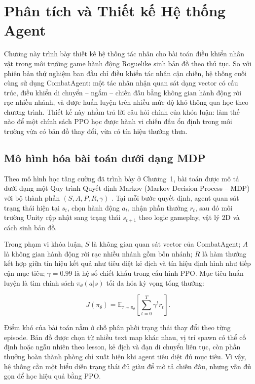 \setcounter{secnumdepth}{3}

\setcounter{chapter}{1}
\chapter[{PHÂN TÍCH VÀ THIẾT KẾ HỆ THỐNG AGENT}]{Phân tích và Thiết kế Hệ thống Agent}

Chương này trình bày thiết kế hệ thống tác nhân cho bài toán điều khiển nhân vật trong môi trường game hành động Roguelike sinh bản đồ theo thủ tục. So với phiên bản thử nghiệm ban đầu chỉ điều khiển tác nhân cận chiến, hệ thống cuối cùng sử dụng CombatAgent: một tác nhân nhận quan sát dạng vector có cấu trúc, điều khiển di chuyển -- ngắm -- chiến đấu bằng không gian hành động rời rạc nhiều nhánh, và được huấn luyện trên nhiều mức độ khó thông qua học theo chương trình. Thiết kế này nhằm trả lời câu hỏi chính của khóa luận: làm thế nào để một chính sách PPO học được hành vi chiến đấu ổn định trong môi trường vừa có bản đồ thay đổi, vừa có tín hiệu thưởng thưa.

\section{Mô hình hóa bài toán dưới dạng MDP}

Theo mô hình học tăng cường đã trình bày ở Chương~1, bài toán được mô tả dưới dạng một Quy trình Quyết định Markov (Markov Decision Process -- MDP) với bộ thành phần $(S,A,P,R,\gamma)$ \cite{Schulman2017}. Tại mỗi bước quyết định, agent quan sát trạng thái hiện tại $s_t$, chọn hành động $a_t$, nhận phần thưởng $r_t$, sau đó môi trường Unity cập nhật sang trạng thái $s_{t+1}$ theo logic gameplay, vật lý 2D và cách sinh bản đồ.

Trong phạm vi khóa luận, $S$ là không gian quan sát vector của CombatAgent; $A$ là không gian hành động rời rạc nhiều nhánh gồm bốn nhánh; $R$ là hàm thưởng kết hợp giữa tín hiệu kết quả như tiêu diệt kẻ địch và tín hiệu định hình như tiếp cận mục tiêu; $\gamma=0.99$ là hệ số chiết khấu trong cấu hình PPO. Mục tiêu huấn luyện là tìm chính sách $\pi_{\theta}(a|s)$ tối đa hóa kỳ vọng tổng thưởng:

\begin{equation}
    J(\pi_\theta) = \mathbb{E}_{\tau \sim \pi_\theta}
    \left[\sum_{t=0}^{T}\gamma^t r_t\right].
\end{equation}

Điểm khó của bài toán nằm ở chỗ phân phối trạng thái thay đổi theo từng episode. Bản đồ được chọn từ nhiều text map khác nhau, vị trí spawn có thể cố định hoặc ngẫu nhiên theo lesson, kẻ địch và đạn di chuyển liên tục, còn phần thưởng hoàn thành phòng chỉ xuất hiện khi agent tiêu diệt đủ mục tiêu. Vì vậy, hệ thống cần một biểu diễn trạng thái đủ giàu để mô tả chiến đấu, nhưng vẫn đủ gọn để học hiệu quả bằng PPO.

